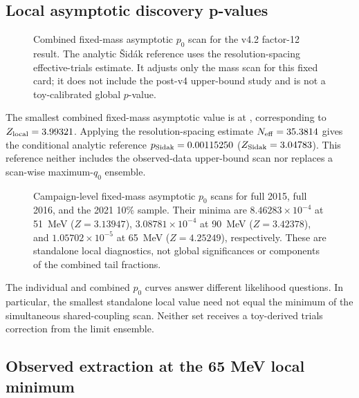 \subsection{Local asymptotic discovery p-values}
\label{sec:results-v4p2-local-p0}
\label{sec:results-v4-local-p0}

\begin{figure}[H]
\centering
{}
\caption{Combined fixed-mass asymptotic $p_0$ scan for the v4.2 factor-12
result. The analytic \v{S}id\'ak reference uses the resolution-spacing
effective-trials estimate. It adjusts only the mass scan for this fixed card; it
does not include the post-v4 upper-bound study and is not a toy-calibrated global
$p$-value.}
\label{fig:results-v4p2-local-p0}
\end{figure}

The smallest combined fixed-mass asymptotic value is
\VFourPTwoLocalPZeroMinimum{} at \VFourPTwoLocalPZeroMass, corresponding to
$Z_{\mathrm{local}}=3.99321$. Applying the resolution-spacing estimate
$N_{\mathrm{eff}}=35.3814$ gives the conditional analytic
reference $p_{\mathrm{Sidak}}=0.00115250$
($Z_{\mathrm{Sidak}}=3.04783$). This reference neither includes the
observed-data upper-bound scan nor replaces a scan-wise maximum-$q_0$ ensemble.

\begin{figure}[H]
\centering
{}
\caption{Campaign-level fixed-mass asymptotic $p_0$ scans for full 2015, full
2016, and the 2021 10\% sample. Their minima are
$8.46283\times10^{-4}$ at 51~MeV ($Z=3.13947$),
$3.08781\times10^{-4}$ at 90~MeV ($Z=3.42378$), and
$1.05702\times10^{-5}$ at 65~MeV ($Z=4.25249$), respectively. These are
standalone local diagnostics, not global significances or components of the
combined tail fractions.}
\label{fig:results-v4p2-individual-p0}
\end{figure}

The individual and combined $p_0$ curves answer different likelihood questions.
In particular, the smallest standalone local value need not equal the minimum of
the simultaneous shared-coupling scan. Neither set receives a toy-derived trials
correction from the limit ensemble.

\subsection{Observed extraction at the 65 MeV local minimum}
\label{sec:results-v4p2-m065-extraction}

